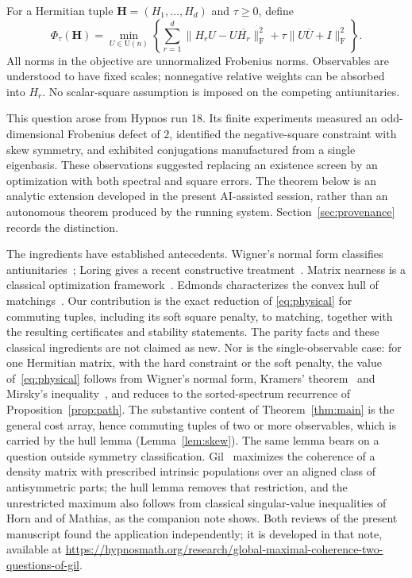 \documentclass[11pt]{article}
\newcommand{\U}{\mathrm U}
\newcommand{\F}{\mathrm F}
\begin{document}
For a Hermitian tuple $\mathbf H=(H_1,\ldots,H_d)$ and $\tau\geq0$, define
\begin{equation}\label{eq:physical}
 \Phi_\tau(\mathbf H)=\min_{U\in\U(n)}
 \left\{\sum_{r=1}^d\|H_rU-U\overline{H_r}\|_\F^2
       +\tau\|U\overline U+I\|_\F^2\right\}.
\end{equation}
All norms in the objective are unnormalized Frobenius norms. Observables
are understood to have fixed scales; nonnegative relative weights can be
absorbed into $H_r$. No scalar-square assumption is imposed on the
competing antiunitaries.

This question arose from Hypnos run 18. Its finite experiments measured
an odd-dimensional Frobenius defect of $2$, identified the negative-square
constraint with skew symmetry, and exhibited conjugations manufactured
from a single eigenbasis. These observations suggested replacing an
existence screen by an optimization with both spectral and square errors.
The theorem below is an analytic extension developed in the present
AI-assisted session, rather than an autonomous theorem produced by the
running system. Section~\ref{sec:provenance} records the distinction.

The ingredients have established antecedents. Wigner's normal form
classifies antiunitaries~\cite{wigner}; Loring gives a recent constructive
treatment~\cite{loring}. Matrix nearness is a classical optimization
framework~\cite{higham}. Edmonds characterizes the convex hull of
matchings~\cite{edmonds}. Our contribution is the exact reduction of
\eqref{eq:physical} for commuting tuples, including its soft square penalty, to matching,
together with the resulting certificates and stability statements.
The parity facts and these classical ingredients are not claimed as new.
Nor is the single-observable case: for one Hermitian matrix, with the
hard constraint or the soft penalty, the value of~\eqref{eq:physical}
follows from Wigner's normal form, Kramers' theorem~\cite{kramers} and
Mirsky's inequality~\cite{mirsky}, and reduces to the sorted-spectrum
recurrence of Proposition~\ref{prop:path}. The substantive content of
Theorem~\ref{thm:main} is the general cost array, hence commuting tuples of two
or more observables, which is carried by the hull lemma
(Lemma~\ref{lem:skew}). The same lemma bears on a question outside
symmetry classification. Gil~\cite{gil} maximizes the coherence of a
density matrix with prescribed intrinsic populations over an aligned class
of antisymmetric parts; the hull lemma removes that restriction, and the
unrestricted maximum also follows from classical singular-value
inequalities of Horn and of Mathias, as the companion note shows. Both
reviews of the present manuscript found the application independently; it
is developed in that note, available at
\url{https://hypnosmath.org/research/global-maximal-coherence-two-questions-of-gil}.
\end{document}

